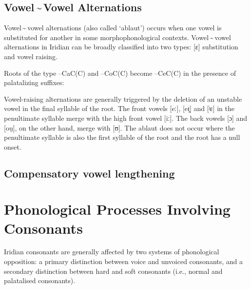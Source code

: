 \subsection{Vowel\,\sim\,Vowel Alternations}
Vowel\,\sim\,vowel alternations (also called `ablaut') occurs when one vowel is substituted for another in some morphophonological contexts. Vowel\,\sim\,vowel alternations in Iridian can be broadly classified into two types: [ɛ] substitution and vowel raising.

Roots of the type --CaC(C) and --CoC(C) become --CeC(C) in the presence of palatalizing suffixes:

\ex
{}
\xe

Vowel-raising alternations are generally triggered by the deletion of an unstable vowel in the final syllable of the root. The front vowels [eː], [eɪ̯] and [ʲɛ] in the penultimate syllable merge with the high front vowel [iː]. The back vowels [ɔ] and [ou̯], on the other hand, merge with [ʊ]. The ablaut does not occur where the penultimate syllable is also the first syllable of the root and the root has a null onset.

\ex
{}
\xe


\subsection{Compensatory vowel lengthening}

\section{Phonological Processes Involving Consonants}

Iridian consonants are generally affected by two systems of phonological opposition: a primary distinction between voice and unvoiced consonants, and a secondary distinction between hard and soft consonants (i.e., normal and palatalised consonants).


